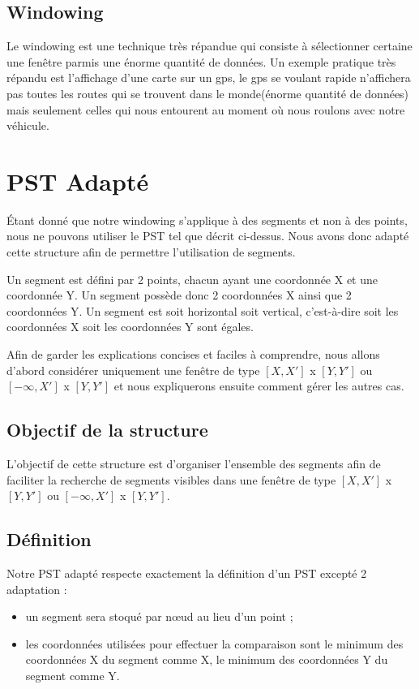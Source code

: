\documentclass[10pt,a4paper]{article}
\begin{document}

\subsection{Windowing}
Le windowing est une technique très répandue qui consiste à sélectionner certaine une fenêtre parmis une énorme quantité de données. Un exemple pratique très répandu est l'affichage d'une carte sur un gps, le gps se voulant rapide n'affichera pas toutes les routes qui se trouvent dans le monde(énorme quantité de données) mais seulement celles qui nous entourent au moment où  nous roulons avec notre véhicule. 

\newpage
\section{PST Adapté}
Étant donné que notre windowing s'applique à des segments et non à des points, nous ne pouvons utiliser le PST tel que décrit ci-dessus. Nous avons donc adapté cette structure afin de permettre l'utilisation de segments.

Un segment est défini par 2 points, chacun ayant une coordonnée X et une coordonnée Y. Un segment possède donc 2 coordonnées X ainsi que 2 coordonnées Y. Un segment est soit horizontal soit vertical, c'est-à-dire soit les coordonnées X soit les coordonnées Y sont égales.

Afin de garder les explications concises et faciles à comprendre, nous allons d'abord considérer uniquement une fenêtre de type $[X, X']$ x $[Y, Y']$ ou $[-\infty, X']$ x $[Y, Y']$ et nous expliquerons ensuite comment gérer les autres cas.

\subsection{Objectif de la structure}
L'objectif de cette structure est d'organiser l'ensemble des segments afin de faciliter la recherche de segments visibles dans une fenêtre de type $[X, X']$ x $[Y, Y']$ ou $[-\infty, X']$ x $[Y, Y']$.

\subsection{Définition}
Notre PST adapté respecte exactement la définition d'un PST excepté 2 adaptation :
\begin{itemize}
	\item un segment sera stoqué par nœud au lieu d'un point ;
	\item les coordonnées utilisées pour effectuer la comparaison sont le minimum des coordonnées X du segment comme X, le minimum des coordonnées Y du segment comme Y.
\end{itemize}
\end{document}
